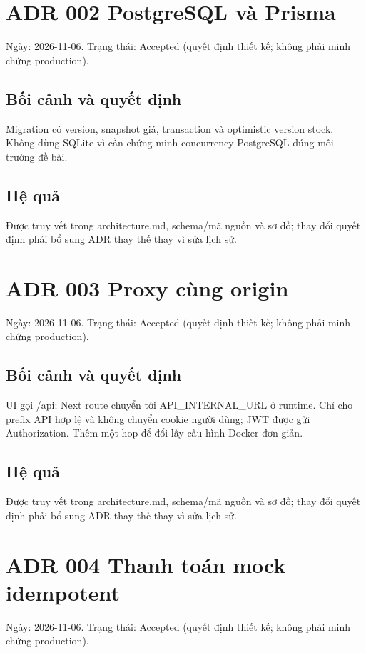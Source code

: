 \documentclass[a4paper,12pt,oneside]{report}
\begin{document}
\section{ADR 002 PostgreSQL và Prisma}

Ngày: 2026-11-06. Trạng thái: Accepted (quyết định thiết kế; không phải minh chứng production).


\subsection{Bối cảnh và quyết định}
Migration có version, snapshot giá, transaction và optimistic version stock. Không dùng SQLite vì cần chứng minh concurrency PostgreSQL đúng môi trường đề bài.


\subsection{Hệ quả}
Được truy vết trong architecture.md, schema/\allowbreak{}mã nguồn và sơ đồ; thay đổi quyết định phải bổ sung ADR thay thế thay vì sửa lịch sử.


\section{ADR 003 Proxy cùng origin}

Ngày: 2026-11-06. Trạng thái: Accepted (quyết định thiết kế; không phải minh chứng production).


\subsection{Bối cảnh và quyết định}
UI gọi /\allowbreak{}api; Next route chuyển tới API\_INTERNAL\_URL ở runtime. Chỉ cho prefix API hợp lệ và không chuyển cookie người dùng; JWT được gửi Authorization. Thêm một hop để đổi lấy cấu hình Docker đơn giản.


\subsection{Hệ quả}
Được truy vết trong architecture.md, schema/\allowbreak{}mã nguồn và sơ đồ; thay đổi quyết định phải bổ sung ADR thay thế thay vì sửa lịch sử.


\section{ADR 004 Thanh toán mock idempotent}

Ngày: 2026-11-06. Trạng thái: Accepted (quyết định thiết kế; không phải minh chứng production).
\end{document}
